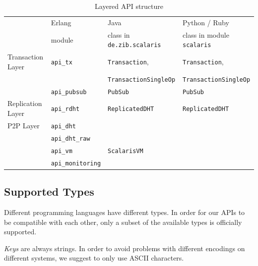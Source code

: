 \documentclass[a4paper]{scrreprt}
\newcommand{\code}[1]{\lstinline[basicstyle=\ttfamily]!#1!}
\begin{document}
\begin{table}
  \centering
    \begin{tabular}{p{4cm}lll}
    \toprule
                      & Erlang                 & Java                         & Python / Ruby              \\
                      & \footnotesize{module}  & \footnotesize{class in \code{de.zib.scalaris}}%
                                                                              & \footnotesize{class in module \code{scalaris}} \\
    \midrule
    Transaction Layer & \code{api_tx}          & \code{Transaction},          & \code{Transaction},        \\
                      &                        & \code{TransactionSingleOp}   & \code{TransactionSingleOp} \\
                      & \code{api_pubsub}      & \code{PubSub}                & \code{PubSub}              \\
    \cmidrule(lr){1-4}
    Replication Layer & \code{api_rdht}        & \code{ReplicatedDHT}         & \code{ReplicatedDHT}       \\
    \cmidrule(lr){1-4}
    P2P Layer         & \code{api_dht}         &                              &                            \\
                      & \code{api_dht_raw}     &                              &                            \\
                      & \code{api_vm}          & \code{ScalarisVM}            &                            \\
                      & \code{api_monitoring}  &                              &                            \\
    \bottomrule
    \end{tabular}
    \caption{Layered API structure}
    \label{api.layers}
\end{table}

\subsection{Supported Types}

Different programming languages have different types. In order for our APIs
to be compatible with each other, only a subset of the available types is
officially supported.

\emph{Keys} are always strings. In order to avoid problems with different
encodings on different systems, we suggest to only use ASCII characters.
\end{document}
